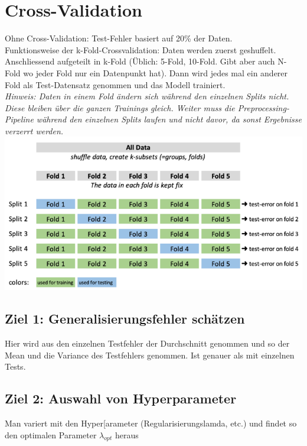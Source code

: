 \section{Cross-Validation}
Ohne Cross-Validation: Test-Fehler basiert auf 20\% der Daten.\\
Funktionsweise der k-Fold-Crossvalidation: Daten werden zuerst geshuffelt. Anschliessend aufgeteilt in k-Fold (Üblich: 5-Fold, 10-Fold. Gibt aber auch N-Fold wo jeder Fold nur ein Datenpunkt hat). Dann wird jedes mal ein anderer Fold als Test-Datensatz genommen und das Modell trainiert.\\
\textit{Hinweis: Daten in einem Fold ändern sich während den einzelnen Splits nicht. Diese bleiben über die ganzen Trainings gleich. Weiter muss die Preprocessing-Pipeline während den einzelnen Splits laufen und nicht davor, da sonst Ergebnisse verzerrt werden.}
\includegraphics[width=\linewidth]{img/cross-validation.png}
\subsection{Ziel 1: Generalisierungsfehler schätzen}
Hier wird aus den einzelnen Testfehler der Durchschnitt genommen und so der Mean und die Variance des Testfehlers genommen. Ist genauer als mit einzelnen Tests.
\subsection{Ziel 2: Auswahl von Hyperparameter}
Man variert mit den Hyper[arameter (Regularisierungslamda, etc.) und findet so den optimalen Parameter $\lambda_{opt}$ heraus
